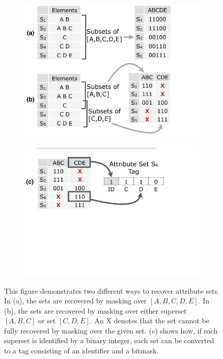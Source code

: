 \begin{figure}[t!] \begin{minipage}{1\linewidth}
\begin{subfigure}[b]{0.96\linewidth} \includegraphics[trim={0 0 5.5cm 0}, clip,
width=\linewidth]{figures/masking} \end{subfigure}
\begin{subfigure}[c]{0.96\linewidth} \includegraphics[trim={0 13cm 5.5cm 0},
clip, width=\linewidth]{figures/making_metadata} \end{subfigure} \end{minipage}
\caption{This figure demonstrates two different ways to recover attribute sets.
In (a), the sets are recovered by masking over $[A,B,C,D,E]$. In (b), the sets
are recovered by masking over either superset $[A,B,C]$ or set $[C,D,E]$. An X
denotes that the set cannot be fully recovered by masking over the given set.
(c) shows how, if each superset is identified by a binary integer, each set can
be converted to a tag consisting of an identifier and a bitmask.}
\label{fig:masking} \end{figure}

